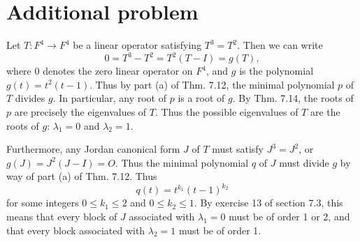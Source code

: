\documentclass[12pt]{article}
\begin{document}
\begin{enumerate}
\end{enumerate}

\section*{Additional problem}

Let $T : F^4 \to F^4$ be a linear operator satisfying $T^3 = T^2$. Then we can write
\begin{equation*}
0 = T^3 - T^2 = T^2(T - I) = g(T),
\end{equation*}
where $0$ denotes the zero linear operator on $F^4$, and $g$ is the polynomial $g(t) = t^2(t - 1)$. Thus by part (a) of Thm. 7.12, the minimal polynomial $p$ of $T$ divides $g$. In particular, any root of $p$ is a root of $g$. By Thm. 7.14, the roots of $p$ are precisely the eigenvalues of $T$. Thus the possible eigenvalues of $T$ are the roots of $g$: $\lambda_1 = 0$ and $\lambda_2 = 1$.

Furthermore, any Jordan canonical form $J$ of $T$ must satisfy $J^3 = J^2$, or $g(J) = J^2(J-I) = O$. Thus the minimal polynomial $q$ of $J$ must divide $g$ by way of part (a) of Thm. 7.12. Thus
\begin{equation*}
q(t) = t^{k_1}(t-1)^{k_2}
\end{equation*}
for some integers $0 \leq k_1 \leq 2$ and $0 \leq k_2 \leq 1$. By exercise 13 of section 7.3, this means that every block of $J$ associated with $\lambda_1 = 0$ must be of order 1 or 2, and that every block associated with $\lambda_2 = 1$ must be of order 1.
\end{document}
